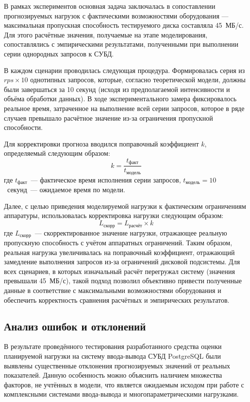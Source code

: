 В рамках экспериментов основная задача заключалась в сопоставлении прогнозируемых нагрузок с фактическими возможностями 
оборудования — максимальная пропускная способность тестируемого диска составляла 45~МБ/с. Для этого расчётные значения, 
получаемые на этапе моделирования, сопоставлялись с эмпирическими результатами, полученными при выполнении серии однородных запросов к СУБД.

В каждом сценарии проводилась следующая процедура. Формировалась серия из $rps \times 10$ однотипных запросов, 
которые, согласно теоретической модели, должны были завершаться за 10 секунд (исходя из предполагаемой интенсивности 
и объёма обработки данных). В ходе экспериментального замера фиксировалось реальное время, затраченное на выполнение 
всей серии запросов, которое в ряде случаев превышало расчётное значение из-за ограничения пропускной способности.

Для корректировки прогноза вводился поправочный коэффициент $k$, определяемый следующим образом:
\begin{equation}
    k = \frac{t_{\text{факт}}}{t_{\text{модель}}}
\end{equation}
где $t_{\text{факт}}$~--- фактическое время исполнения серии запросов, $t_{\text{модель}} = 10$~секунд~--- ожидаемое время по модели.

Далее, с целью приведения моделируемой нагрузки к фактическим ограничениям аппаратуры, использовалась корректировка нагрузки следующим образом:
\begin{equation}
    L_{\text{скорр}} = L_{\text{расчёт}} \times k
\end{equation}
где $L_{\text{скорр}}$~--- скорректированное значение нагрузки, отражающее реальную пропускную способность с учётом аппаратных ограничений.
Таким образом, реальная нагрузка увеличивалась на поправочный коэффициент, отражающий замедление выполнения запросов из-за ограничений дисковой подсистемы. 
Для всех сценариев, в которых изначальный расчёт перегружал систему (значения превышали 45~МБ/с), 
такой подход позволил объективно привести полученные данные в соответствие с максимальными возможностями 
оборудования и обеспечить корректность сравнения расчётных и эмпирических результатов.

\subsection{Анализ ошибок и отклонений}

В результате проведённого тестирования разработанного средства оценки планируемой нагрузки на систему ввода-вывода СУБД PostgreSQL 
были выявлены существенные отклонения прогнозируемых значений от реальных показателей. Данную особенность можно объяснить наличием 
множества факторов, не учтённых в модели, что является ожидаемым исходом при работе с комплексными системами ввода-вывода и многопараметрическими нагрузками.

